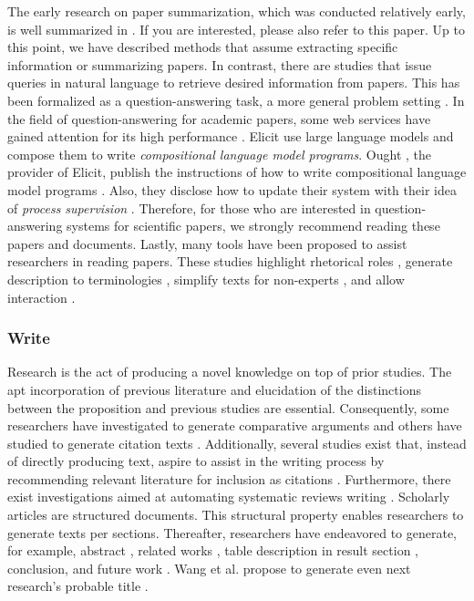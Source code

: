 \documentclass{book}
\begin{document}
The early research on paper summarization, which was conducted relatively early, is well summarized in \cite{altmami2022automatic}. If you are interested, please also refer to this paper.
Up to this point, we have described methods that assume extracting specific information or summarizing papers. In contrast, there are studies that issue queries in natural language to retrieve desired information from papers. This has been formalized as a question-answering task, a more general problem setting \cite{lu2022learn,ruggeri2022argscichat,saikh2022scienceqa}. 
In the field of question-answering for academic papers, some web services have gained attention for its high performance \cite{elicit,scispace}. Elicit use large language models and compose them to write \textit{compositional language model programs}. Ought \cite{ought}, the provider of Elicit, publish the instructions of how to write compositional language model programs \cite{primer2022}. Also, they disclose how to update their system with their idea of \textit{process supervision} \cite{reppert2023iterated}. Therefore, for those who are interested in question-answering systems for scientific papers, we strongly recommend reading these papers and documents.
Lastly, many tools have been proposed to assist researchers in reading papers. These studies highlight rhetorical roles \cite{fok2023scim,lauscher2018arguminsci}, generate description to terminologies \cite{august2022generating,head2021augmenting,murthy2022accord}, simplify texts for non-experts \cite{august2022paper,jeblick2022chatgpt}, and allow interaction \cite{kang2022threddy,elicit,scispace}.
\subsubsection{Write}
Research is the act of producing a novel knowledge on top of prior studies. The apt incorporation of previous literature and elucidation of the distinctions between the proposition and previous studies are essential. Consequently, some researchers have investigated to generate comparative arguments \cite{yu2022scientific} and others have studied to generate citation texts \cite{arita2022citation,gu2022controllable,wang2021autocite,xing2020automatic,funkquist2022citebench}. Additionally, several studies exist that, instead of directly producing text, aspire to assist in the writing process by recommending relevant literature for inclusion as citations \cite{farber2020citation,zhang2020dual,duma2019contextual,farber2018cite,gosangi2021use}. Furthermore, there exist investigations aimed at automating systematic reviews writing \cite{dones2022systematic}.
Scholarly articles are structured documents. This structural property enables researchers to generate texts per sections. Thereafter, 
researchers have endeavored to generate, for example, abstract \cite{kumarasinghe2022automatic,gao2022comparing,wang2019paperrobot}, related works \cite{li2022automatic,shah2021generating,liu2023causal}, table description in result section \cite{moosavi2021scigen,moosavi2021learning}, conclusion, and future work \cite{wang2019paperrobot}. Wang et al. propose to generate even next research's probable title \cite{wang2019paperrobot}.
\end{document}
